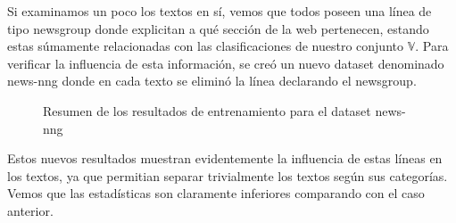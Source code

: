 \documentclass[a4paper,10pt]{article}
\begin{document}
Si examinamos un poco los textos en sí, vemos que todos poseen una línea de tipo \textsf{newsgroup} donde explicitan a qué sección de la web pertenecen, estando estas súmamente relacionadas con las clasificaciones de nuestro conjunto $\mathbb{V}$. Para verificar la influencia de esta información, se creó un nuevo dataset denominado \textsf{news-nng} donde en cada texto se eliminó la línea declarando el newsgroup.

\vspace{5pt}

\begin{multicols}{2}

\begin{figure}[H]
\centering

\caption{Resumen de los resultados de entrenamiento para el dataset \textsf{news-nng}}
\end{figure}

Estos nuevos resultados muestran evidentemente la influencia de estas líneas en los textos, ya que permitian separar trivialmente los textos según sus categorías. Vemos que las estadísticas son claramente inferiores comparando con el caso anterior.   
\end{multicols}
\end{document}
